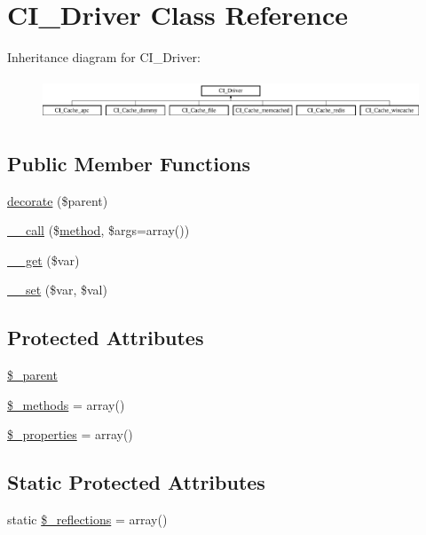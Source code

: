 \hypertarget{class_c_i___driver}{}\section{C\+I\+\_\+\+Driver Class Reference}
\label{class_c_i___driver}
Inheritance diagram for C\+I\+\_\+\+Driver\+:\begin{figure}[H]
\begin{center}
\leavevmode
\includegraphics[height=1.244444cm]{class_c_i___driver}
\end{center}
\end{figure}
\subsection*{Public Member Functions}
\begin{DoxyCompactItemize}
\item 
\mbox{\hyperlink{class_c_i___driver_acf6a5ad6a84d4c7a27f463cbb618004b}{decorate}} (\$parent)
\item 
\mbox{\hyperlink{class_c_i___driver_a57936fde7f1adea3f3e7dfca474a1786}{\+\_\+\+\_\+call}} (\$\mbox{\hyperlink{waiter_2order_8php_ac0cc2006fd803bf741cbbe406e3f6361}{method}}, \$args=array())
\item 
\mbox{\hyperlink{class_c_i___driver_a8fb2d9cdca17b87400e780b9f9720933}{\+\_\+\+\_\+get}} (\$var)
\item 
\mbox{\hyperlink{class_c_i___driver_a921783e9d7c3fb79479375193c9f3d1e}{\+\_\+\+\_\+set}} (\$var, \$val)
\end{DoxyCompactItemize}
\subsection*{Protected Attributes}
\begin{DoxyCompactItemize}
\item 
\mbox{\hyperlink{class_c_i___driver_a8c040f02d9e695416231845d2aaf7f59}{\$\+\_\+parent}}
\item 
\mbox{\hyperlink{class_c_i___driver_a148e2042f169cec802078e58a46ace92}{\$\+\_\+methods}} = array()
\item 
\mbox{\hyperlink{class_c_i___driver_a677f712430f384ffa402fac50940ace4}{\$\+\_\+properties}} = array()
\end{DoxyCompactItemize}
\subsection*{Static Protected Attributes}
\begin{DoxyCompactItemize}
\item 
static \mbox{\hyperlink{class_c_i___driver_a3eae4dfd334261dd94fe0e148501513f}{\$\+\_\+reflections}} = array()
\end{DoxyCompactItemize}


